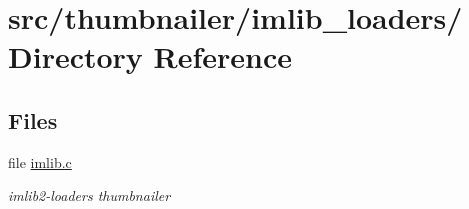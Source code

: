 \hypertarget{dir_000029}{
\section{src/thumbnailer/imlib\_\-loaders/ Directory Reference}
\label{dir_000029}
}
\subsection*{Files}
\begin{CompactItemize}
\item 
file \hyperlink{imlib_8c}{imlib.c}
\begin{CompactList}\small\item\em imlib2-loaders thumbnailer \item\end{CompactList}

\end{CompactItemize}

